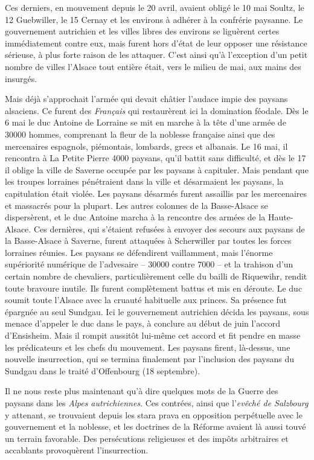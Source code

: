 \documentclass[french,twoside]{book} %
\begin{document}
Ces derniers, en mouvement depuis le 20 avril, avaient obligé le 10 mai Soultz, le 12 Guebwiller, le 15 Cernay et les environs à adhérer à la confrérie paysanne. Le gouvernement autrichien et les villes libres des environs se liguèrent certes immédiatement contre eux, mais furent hors d’état de leur opposer une résistance sérieuse, à plus forte raison de les attaquer. C’est ainsi qu’à l’exception d’un petit nombre de villes l’Alsace tout entière était, vers le milieu de mai, aux mains des insurgés.\par
Mais déjà s’approchait l’armée qui devait châtier l’audace impie des paysans alsaciens. Ce furent des \emph{Français} qui restaurèrent ici la domination féodale. Dès le 6 mai le duc Antoine de Lorraine se mit en marche à la tête d’une armée de 30000 hommes, comprenant la fleur de la noblesse française ainsi que des mercenaires espagnols, piémontais, lombards, grecs et albanais. Le 16 mai, il rencontra à La Petite Pierre 4000 paysans, qu’il battit sans difficulté, et dès le 17 il oblige la ville de Saverne occupée par les paysans à capituler. Mais pendant que les troupes lorraines pénétraient dans la ville et désarmaient les paysans, la capitulation était violée. Les paysans désarmés furent assaillis par les mercenaires et massacrés pour la plupart. Les autres colonnes de la Basse-Alsace se dispersèrent, et le duc Antoine marcha à la rencontre des armées de la Haute-Alsace. Ces dernières, qui s’étaient refusées à envoyer des secours aux paysans de la Basse-Alsace à Saverne, furent attaquées à Scherwiller par toutes les forces lorraines réunies. Les paysans se défendirent vaillamment, mais l’énorme supériorité numérique de l’advesaire – 30000 contre 7000 – et la trahison d’un certain nombre de chevaliers, particulièrement celle du bailli de Riquewihr, rendit toute bravoure inutile. Ils furent complètement battus et mis en déroute. Le duc soumit toute l’Alsace avec la cruauté habituelle aux princes. Sa présence fut épargnée au seul Sundgau. Ici le gouvernement autrichien décida les paysans, sous menace d’appeler le duc dans le pays, à conclure au début de juin l’accord d’Ensisheim. Mais il rompit aussitôt lui-même cet accord et fit pendre en masse les prédicateurs et les chefs du mouvement. Les paysans firent, là-dessus, une nouvelle insurrection, qui se termina finalement par l’inclusion des paysans du Sundgau dans le traité d’Offenbourg (18 septembre).\par
Il ne nous reste plus maintenant qu’à dire quelques mots de la Guerre des paysans dans les \emph{Alpes autrichiennes}. Ces contrées, ainsi que l’\emph{evêché de Salzbourg} y attenant, se trouvaient depuis les stara prava en opposition perpétuelle avec le gouvernement et la noblesse, et les doctrines de la Réforme avaient là aussi touvé un terrain favorable. Des persécutions religieuses et des impôts arbitraires et accablants provoquèrent l’insurrection.\par
\end{document}
